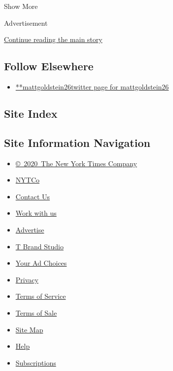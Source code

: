 Show More

Advertisement

\protect\hyperlink{after-mid2}{Continue reading the main story}

\hypertarget{follow-elsewhere}{%
\subsection{Follow Elsewhere}\label{follow-elsewhere}}

\begin{itemize}
\tightlist
\item
  \href{https://twitter.com/mattgoldstein26}{**mattgoldstein26twitter
  page for mattgoldstein26}
\end{itemize}

\hypertarget{site-index}{%
\subsection{Site Index}\label{site-index}}

\hypertarget{site-information-navigation}{%
\subsection{Site Information
Navigation}\label{site-information-navigation}}

\begin{itemize}
\tightlist
\item
  \href{https://help.nytimes.com/hc/en-us/articles/115014792127-Copyright-notice}{©~2020~The
  New York Times Company}
\end{itemize}

\begin{itemize}
\tightlist
\item
  \href{https://www.nytco.com/}{NYTCo}
\item
  \href{https://help.nytimes.com/hc/en-us/articles/115015385887-Contact-Us}{Contact
  Us}
\item
  \href{https://www.nytco.com/careers/}{Work with us}
\item
  \href{https://nytmediakit.com/}{Advertise}
\item
  \href{http://www.tbrandstudio.com/}{T Brand Studio}
\item
  \href{https://www.nytimes.com/privacy/cookie-policy\#how-do-i-manage-trackers}{Your
  Ad Choices}
\item
  \href{https://www.nytimes.com/privacy}{Privacy}
\item
  \href{https://help.nytimes.com/hc/en-us/articles/115014893428-Terms-of-service}{Terms
  of Service}
\item
  \href{https://help.nytimes.com/hc/en-us/articles/115014893968-Terms-of-sale}{Terms
  of Sale}
\item
  \href{https://spiderbites.nytimes.com}{Site Map}
\item
  \href{https://help.nytimes.com/hc/en-us}{Help}
\item
  \href{https://www.nytimes.com/subscription?campaignId=37WXW}{Subscriptions}
\end{itemize}
